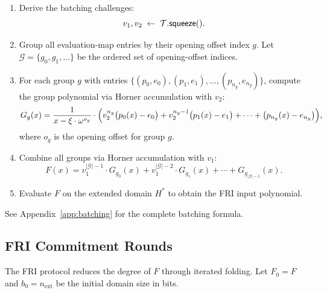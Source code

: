 \begin{enumerate}[label=(\roman*)]
  \item Derive the batching challenges:
        \[
          v_1, v_2 \;\leftarrow\; \mathcal{T}.\textsf{squeeze}().
        \]

  \item Group all evaluation-map entries by their opening offset index $g$.
        Let $\mathcal{G} = \{g_0, g_1, \ldots\}$ be the ordered set of
        opening-offset indices.

  \item For each group $g$ with entries $\{(p_0, e_0), (p_1, e_1), \ldots, (p_{n_g}, e_{n_g})\}$,
        compute the group polynomial via Horner accumulation with $v_2$:
        \begin{equation}
          \label{eq:fri-group}
          G_g(x) = \frac{1}{x - \xi \cdot \omega^{o_g}} \cdot
                   \Bigl(
                     v_2^{n_g}\bigl(p_0(x) - e_0\bigr) +
                     v_2^{n_g-1}\bigl(p_1(x) - e_1\bigr) +
                     \cdots +
                     \bigl(p_{n_g}(x) - e_{n_g}\bigr)
                   \Bigr),
        \end{equation}
        where $o_g$ is the opening offset for group $g$.

  \item Combine all groups via Horner accumulation with $v_1$:
        \begin{equation}
          \label{eq:fri-polynomial}
          F(x) = v_1^{|\mathcal{G}|-1} \cdot G_{g_0}(x) +
                 v_1^{|\mathcal{G}|-2} \cdot G_{g_1}(x) +
                 \cdots + G_{g_{|\mathcal{G}|-1}}(x).
        \end{equation}

  \item Evaluate $F$ on the extended domain $H^*$ to obtain the FRI input polynomial.
\end{enumerate}

See Appendix~\ref{app:batching} for the complete batching formula.

\subsection{FRI Commitment Rounds}
\label{sec:fri-rounds}

The FRI protocol reduces the degree of $F$ through iterated folding.
Let $F_0 = F$ and $b_0 = n_{\mathrm{ext}}$ be the initial domain size in bits.

